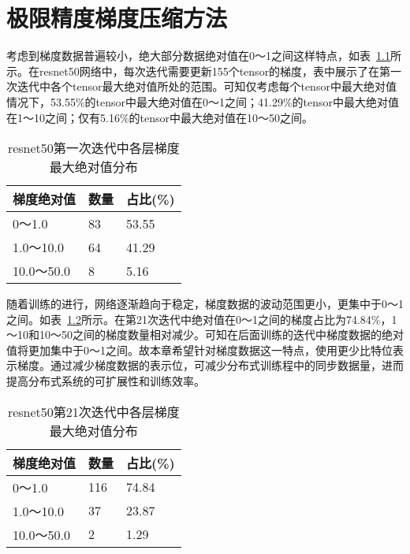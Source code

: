 \chapter{极限精度梯度压缩方法}
考虑到梯度数据普遍较小，绝大部分数据绝对值在0～1之间这样特点，如表~\ref{tab:resnet50_1iter_grad_fabs}所示。在resnet50网络中，每次迭代需要更新155个tensor的梯度，表中展示了在第一次迭代中各个tensor最大绝对值所处的范围。可知仅考虑每个tensor中最大绝对值情况下，53.55\%的tensor中最大绝对值在0～1之间；41.29\%的tensor中最大绝对值在1～10之间；仅有5.16\%的tensor中最大绝对值在10～50之间。
\begin{table}[htb]
\centering
\noindent\begin{minipage}{0.65\textwidth}
\centering
\caption{resnet50第一次迭代中各层梯度最大绝对值分布}
\label{tab:resnet50_1iter_grad_fabs}
\begin{tabular}{p{2.5cm}p{2.5cm}p{2.5cm}}
\toprule[1.5pt]
梯度绝对值 & 数量 & 占比(\%) \\\midrule[1pt]
0～1.0 & 83 & 53.55\\
1.0～10.0 & 64 & 41.29\\
10.0～50.0 & 8 & 5.16\\
\midrule[1pt]
\end{tabular}
\end{minipage}
\end{table}

随着训练的进行，网络逐渐趋向于稳定，梯度数据的波动范围更小，更集中于0～1之间。如表~\ref{tab:resnet50_21iter_grad_fabs}所示。在第21次迭代中绝对值在0～1之间的梯度占比为74.84\%，1～10和10～50之间的梯度数量相对减少。可知在后面训练的迭代中梯度数据的绝对值将更加集中于0～1之间。故本章希望针对梯度数据这一特点，使用更少比特位表示梯度。通过减少梯度数据的表示位，可减少分布式训练程中的同步数据量，进而提高分布式系统的可扩展性和训练效率。
\begin{table}[htb]
\centering
\noindent\begin{minipage}{0.65\textwidth}
\centering
\caption{resnet50第21次迭代中各层梯度最大绝对值分布}
\label{tab:resnet50_21iter_grad_fabs}
\begin{tabular}{p{2.5cm}p{2.5cm}p{2.5cm}}
\toprule[1.5pt]
梯度绝对值 & 数量 & 占比(\%) \\\midrule[1pt]
0～1.0 & 116 & 74.84\\
1.0～10.0 & 37 & 23.87\\
10.0～50.0 & 2 & 1.29\\
\midrule[1pt]
\end{tabular}
\end{minipage}
\end{table}

